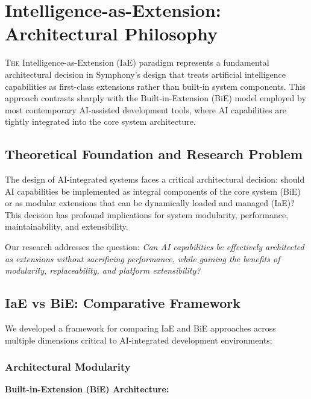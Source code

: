 
\section{Intelligence-as-Extension: Architectural Philosophy}
\label{sec:iae-concept}

\vspace{0.5cm}
\lettrine{T}{he} Intelligence-as-Extension (IaE) paradigm represents a fundamental architectural decision in Symphony's design that treats artificial intelligence capabilities as first-class extensions rather than built-in system components. This approach contrasts sharply with the Built-in-Extension (BiE) model employed by most contemporary AI-assisted development tools, where AI capabilities are tightly integrated into the core system architecture.

\subsection{Theoretical Foundation and Research Problem}

The design of AI-integrated systems faces a critical architectural decision: should AI capabilities be implemented as integral components of the core system (BiE) or as modular extensions that can be dynamically loaded and managed (IaE)? This decision has profound implications for system modularity, performance, maintainability, and extensibility.

Our research addresses the question: \textit{Can AI capabilities be effectively architected as extensions without sacrificing performance, while gaining the benefits of modularity, replaceability, and platform extensibility?}

\subsection{IaE vs BiE: Comparative Framework}

We developed a framework for comparing IaE and BiE approaches across multiple dimensions critical to AI-integrated development environments:

\subsubsection{Architectural Modularity}

\textbf{Built-in-Extension (BiE) Architecture:}

